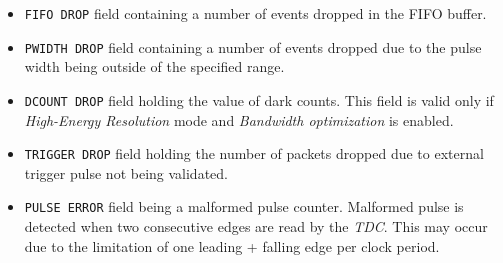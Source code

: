 \begin{itemize}
\item \verb|FIFO DROP| field containing a number of events dropped in the FIFO buffer.
\item \verb|PWIDTH DROP| field containing a number of events dropped due to the pulse width being outside of the specified range.
\item \verb|DCOUNT DROP| field holding the value of dark counts. This field is valid only if \emph{High-Energy Resolution} mode and \emph{Bandwidth optimization} is enabled. 
\item \verb|TRIGGER DROP| field holding the number of packets dropped due to external trigger pulse not being validated. 
\item \verb|PULSE ERROR| field being a malformed pulse counter. Malformed pulse is detected when two consecutive edges are read by the \emph{TDC}. This may occur due to the limitation of one leading + falling edge per clock period.
\end{itemize}
\newpage
%
